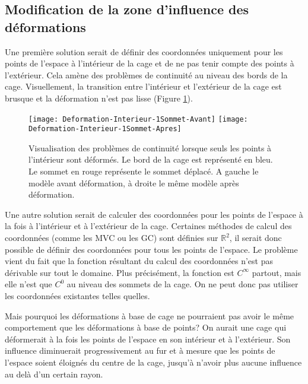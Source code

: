 \subsection{Modification de la zone d'influence des déformations}

Une première solution serait de définir des coordonnées uniquement pour les
points de l'espace à l'intérieur de la cage et de ne pas tenir compte des
points à l'extérieur. Cela amène des problèmes de continuité au niveau des
bords de la cage. Visuellement, la transition entre l'intérieur et l'extérieur
de la cage est brusque et la déformation n'est pas lisse (Figure \ref{MELVI}).

\begin{figure}[ht]
  \begin{center}
    \scalebox{0.2}
    {
      \texttt{[image: Deformation-Interieur-1Sommet-Avant]}
      \texttt{[image: Deformation-Interieur-1Sommet-Apres]}
    }

    \caption[Problème de continuité déformation naïve] {Visualisation des
problèmes de continuité lorsque seuls les points à l'intérieur sont déformés.
Le bord de la cage est représenté en bleu. Le sommet en rouge représente le
sommet déplacé. A gauche le modèle avant déformation, à droite le même modèle
après déformation.}

    \label{MELVI}
  \end{center}
\end{figure}

Une autre solution serait de calculer des coordonnées pour les points de
l'espace à la fois à l'intérieur et à l'extérieur de la cage. Certaines
méthodes de calcul des coordonnées (comme les MVC ou les GC) sont définies sur
$\mathbb{R}^2$, il serait donc possible de définir des coordonnées pour tous
les points de l'espace. Le problème vient du fait que la fonction résultant du
calcul des coordonnées n'est pas dérivable sur tout le domaine. Plus
précisément, la fonction est $C^{\infty}$ partout, mais elle n'est que $C^0$
au niveau des sommets de la cage. On ne peut donc pas utiliser les coordonnées
existantes telles quelles.

Mais pourquoi les déformations à base de cage ne pourraient pas avoir le même
comportement que les déformations à base de points? On aurait une cage qui
déformerait à la fois les points de l'espace en son intérieur et à
l'extérieur.  Son influence diminuerait progressivement au fur et à mesure que
les points de l'espace soient éloignés du centre de la cage, jusqu'à n'avoir
plus aucune influence au delà d'un certain rayon.

